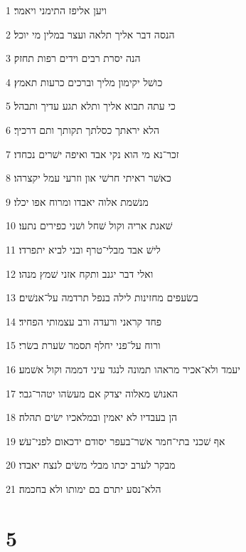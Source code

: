 \par 1 ויען אליפז התימני ויאמר׃
\par 2 הנסה דבר אליך תלאה ועצר במלין מי יוכל׃
\par 3 הנה יסרת רבים וידים רפות תחזק׃
\par 4 כושׁל יקימון מליך וברכים כרעות תאמץ׃
\par 5 כי עתה תבוא אליך ותלא תגע עדיך ותבהל׃
\par 6 הלא יראתך כסלתך תקותך ותם דרכיך׃
\par 7 זכר־נא מי הוא נקי אבד ואיפה ישׁרים נכחדו׃
\par 8 כאשׁר ראיתי חרשׁי און וזרעי עמל יקצרהו׃
\par 9 מנשׁמת אלוה יאבדו ומרוח אפו יכלו׃
\par 10 שׁאגת אריה וקול שׁחל ושׁני כפירים נתעו׃
\par 11 לישׁ אבד מבלי־טרף ובני לביא יתפרדו׃
\par 12 ואלי דבר יגנב ותקח אזני שׁמץ מנהו׃
\par 13 בשׂעפים מחזינות לילה בנפל תרדמה על־אנשׁים׃
\par 14 פחד קראני ורעדה ורב עצמותי הפחיד׃
\par 15 ורוח על־פני יחלף תסמר שׂערת בשׂרי׃
\par 16 יעמד ולא־אכיר מראהו תמונה לנגד עיני דממה וקול אשׁמע׃
\par 17 האנושׁ מאלוה יצדק אם מעשׂהו יטהר־גבר׃
\par 18 הן בעבדיו לא יאמין ובמלאכיו ישׂים תהלה׃
\par 19 אף שׁכני בתי־חמר אשׁר־בעפר יסודם ידכאום לפני־עשׁ׃
\par 20 מבקר לערב יכתו מבלי משׂים לנצח יאבדו׃
\par 21 הלא־נסע יתרם בם ימותו ולא בחכמה׃

\chapter{5}

